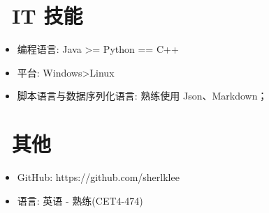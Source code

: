\documentclass{resume}
\begin{document}

\section{\faCogs\ IT 技能}
\begin{itemize}[parsep=0.5ex]
  \item 编程语言: Java >= Python == C++ 
  \item 平台: Windows>Linux
  \item 脚本语言与数据序列化语言: 熟练使用 Json、Markdown；
\end{itemize}

\section{\faInfo\ 其他}
\begin{itemize}[parsep=0.5ex]
  \item GitHub: https://github.com/sherlklee
  \item 语言: 英语 - 熟练(CET4-474)
\end{itemize}

%
%
\end{document}
